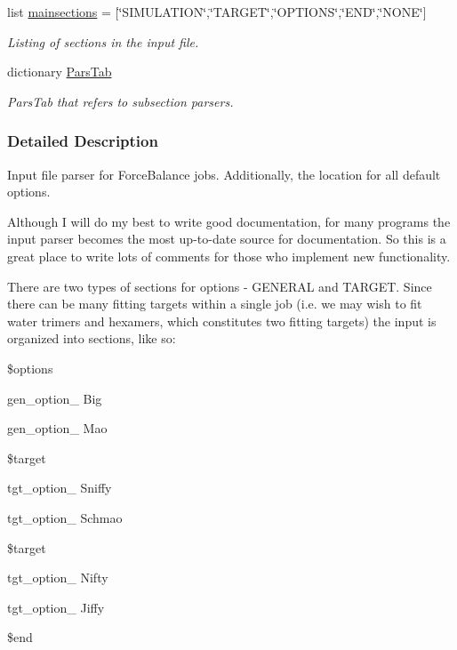 \begin{DoxyCompactItemize}
list \hyperlink{namespaceforcebalance_1_1parser_a525ac339b645dbfb9fbb7cc672712504}{mainsections} = \mbox{[}\char`\"{}\-S\-I\-M\-U\-L\-A\-T\-I\-O\-N\char`\"{},\char`\"{}\-T\-A\-R\-G\-E\-T\char`\"{},\char`\"{}\-O\-P\-T\-I\-O\-N\-S\char`\"{},\char`\"{}\-E\-N\-D\char`\"{},\char`\"{}\-N\-O\-N\-E\char`\"{}\mbox{]}
\begin{DoxyCompactList}\small\item\em \-Listing of sections in the input file. \end{DoxyCompactList}\item 
dictionary \hyperlink{namespaceforcebalance_1_1parser_af0a8dc5cdc54cc88ded3ee3b46d71672}{\-Pars\-Tab}
\begin{DoxyCompactList}\small\item\em \-Pars\-Tab that refers to subsection parsers. \end{DoxyCompactList}\end{DoxyCompactItemize}


\subsubsection{\-Detailed \-Description}
\-Input file parser for \-Force\-Balance jobs. \-Additionally, the location for all default options.

\-Although \-I will do my best to write good documentation, for many programs the input parser becomes the most up-\/to-\/date source for documentation. \-So this is a great place to write lots of comments for those who implement new functionality.

\-There are two types of sections for options -\/ \-G\-E\-N\-E\-R\-A\-L and \-T\-A\-R\-G\-E\-T. \-Since there can be many fitting targets within a single job (i.\-e. we may wish to fit water trimers and hexamers, which constitutes two fitting targets) the input is organized into sections, like so\-:

\$options\par
 gen\-\_\-option\-\_ \-Big\par
 gen\-\_\-option\-\_ \-Mao\par
 \$target\par
 tgt\-\_\-option\-\_ \-Sniffy\par
 tgt\-\_\-option\-\_ \-Schmao\par
 \$target\par
 tgt\-\_\-option\-\_ \-Nifty\par
 tgt\-\_\-option\-\_ \-Jiffy\par
 \$end

